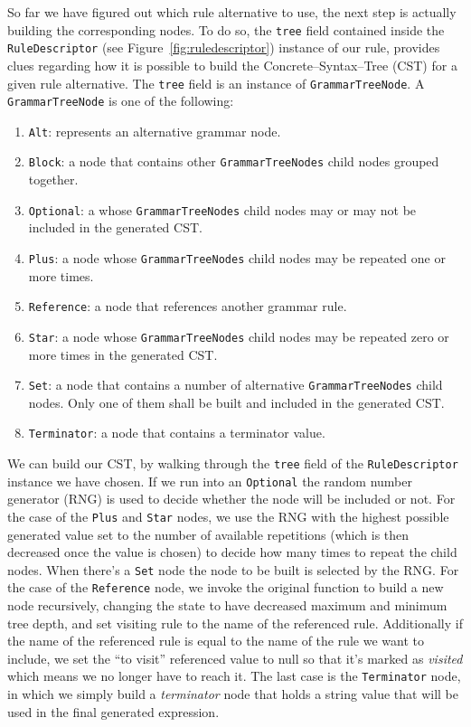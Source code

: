 \documentclass[]{usiinfbachelorproject}
\begin{document}
So far we have figured out which rule alternative to use, the next step is
actually building the corresponding nodes. To do so, the \texttt{tree}
field contained inside the \texttt{RuleDescriptor} (see
Figure~\ref{fig:ruledescriptor}) instance of our rule, provides clues regarding
how it is possible to build the Concrete–Syntax–Tree (CST) for a given rule
alternative. The \texttt{tree} field is an instance of \texttt{GrammarTreeNode}.
A \texttt{GrammarTreeNode} is one of the following:

\begin{enumerate}
\item \texttt{Alt}: represents an alternative grammar node.
\item \texttt{Block}: a node that contains other \texttt{GrammarTreeNodes}
      child nodes grouped together.
\item \texttt{Optional}: a whose \texttt{GrammarTreeNodes} child nodes may or
      may not be included in the generated CST\@.
\item \texttt{Plus}: a node whose \texttt{GrammarTreeNodes} child nodes may be
      repeated one or more times.
\item \texttt{Reference}: a node that references another grammar rule.
\item \texttt{Star}: a node whose \texttt{GrammarTreeNodes} child nodes may be
      repeated zero or more times in the generated CST\@.
\item \texttt{Set}: a node that contains a number of alternative
      \texttt{GrammarTreeNodes} child nodes. Only one of them shall be
      built and included in the generated CST\@.
\item \texttt{Terminator}: a node that contains a terminator value.
\end{enumerate}

We can build our CST, by walking through the \texttt{tree} field of the
\texttt{RuleDescriptor} instance we have chosen. If we run into an 
\texttt{Optional} the random number generator (RNG) is used to decide whether
the node will be included or not. For the case of the \texttt{Plus} and
\texttt{Star} nodes, we use the RNG with the highest possible generated value
set to the number of available repetitions (which is then decreased once the
value is chosen) to decide how many times to repeat the child nodes.
When there's a \texttt{Set} node the node to be built is selected by the RNG\@.
For the case of the \texttt{Reference} node, we invoke the original function
to build a new node recursively, changing the state to have decreased maximum
and minimum tree depth, and set visiting rule to the name of the referenced
rule. Additionally if the name of the referenced rule is equal to the name of
the rule we want to include, we set the ``to visit'' referenced value to null
so that it's marked as \textit{visited} which means we no longer have to
reach it.
The last case is the \texttt{Terminator} node, in which we simply build a
\textit{terminator} node that holds a string value that will be used in the
final generated expression.
\end{document}
